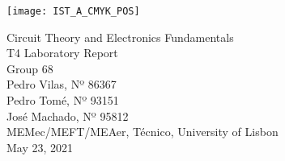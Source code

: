 
\thispagestyle {empty}

\texttt{[image: IST\_A\_CMYK\_POS]}

\begin{center}
%
\vspace{1.0cm}

\vspace{1cm}
{\FontLb Circuit Theory and Electronics Fundamentals} \\ %
\vspace{5cm}
{\FontLn T4 Laboratory Report}\vspace{1cm} \\
\vspace{5cm}
{\FontLb Group 68} \\
\vspace{1cm}
{\FontSn Pedro Vilas, Nº 86367} \\
{\FontSn Pedro Tomé, Nº 93151} \\
{\FontSn José Machado, Nº 95812} \\
\vspace{1cm}
{\FontSn  MEMec/MEFT/MEAer, Técnico, University of Lisbon} \\ %
\vspace{1cm}
{\FontSn May 23, 2021} \\ %
%
\end{center}

